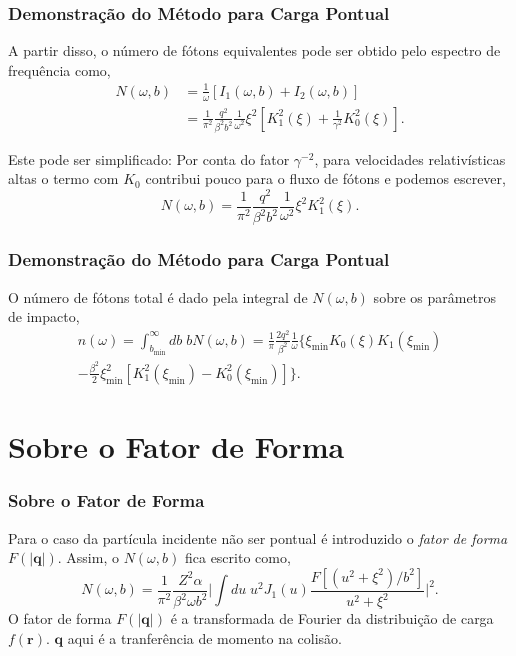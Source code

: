 \documentclass[xcolor=dvipsnames]{beamer}
\renewcommand{\vec}{\mathbf}
\begin{document}
\begin{frame}
	\frametitle{Demonstração do Método para Carga Pontual}
	A partir disso, o número de fótons equivalentes pode ser obtido pelo
	espectro de frequência como,
	\begin{equation}
		\begin{split}
		N(\omega , b) &= \frac{1}{\omega} \left[ I_1 (\omega , b) + I_2(\omega
			, b) \right]\\
			&= \frac{1}{\pi ^2} \frac{q^2} {\beta ^2 b^2}
			\frac{1}{\omega ^2} \xi ^2 \left[K_1^2 (\xi ) + \frac{1}{\gamma ^2}
			K_0 ^2 (\xi ) \right]. \label{eq_EP-SPEC}
		\end{split}
	\end{equation}
	\begin{block}{Este pode ser simplificado:}
		Por conta do fator $\gamma ^{-2}$, para velocidades relativísticas
		altas o termo com $K_0$ contribui pouco para o fluxo de fótons e
		podemos escrever,
		\begin{equation}
			N(\omega , b) = \frac{1}{\pi ^2} \frac{q^2} {\beta ^2 b^2}
			\frac{1}{\omega ^2} \xi ^2 K_1 ^2 (\xi).
		\end{equation}
	\end{block}
\end{frame}

\begin{frame}
	\frametitle{Demonstração do Método para Carga Pontual}
	O número de fótons total é dado pela integral de $N(\omega , b)$ sobre os
	parâmetros de impacto,
	\begin{multline}
		n(\omega) = \int _{b_{\text{min}}}^\infty db\; bN(\omega , b)  
		= \frac{1}{\pi} \frac{2q^2}{\beta ^2} \frac{1}{\omega} \biggl\{ \xi
		_\text{min} K_0 \left( \xi \right) K_1 \left( \xi _\text{min} \right) 
		\\
		-\frac{\beta ^2}{2} \xi _\text{min} ^2 \left[ K_1 ^2 \left( \xi
		_\text{min} \right) - K_0 ^2 \left( \xi _\text{min} \right) \right]
		\biggr\}. \label{eq_EPT}
	\end{multline}
\end{frame}

\section{Sobre o Fator de Forma}
\begin{frame}
	\frametitle{Sobre o Fator de Forma}
	Para o caso da partícula incidente não ser pontual é introduzido o
	\textit{fator de forma} $F(|\vec{q}|)$. Assim, o $N(\omega , b)$ fica
	escrito como,
	\begin{equation}
		N(\omega , b) = \frac{1}{\pi ^2} \frac{Z^2 \alpha}{\beta ^2 \omega b^2}
		\Bigg| \int du \; u^2 J_1 (u) \frac{F[(u^2 + \xi ^2)/b^2]}{u^2 + \xi ^2}
		\Bigg|^2. \label{eq_EP-SPEC-F}
	\end{equation}
	O fator de forma $F(|\vec{q}|)$ é a transformada de Fourier da distribuição
	de carga $f(\vec{r})$. $\vec{q}$ aqui é a tranferência de momento na
	colisão.
\end{frame}
\end{document}
